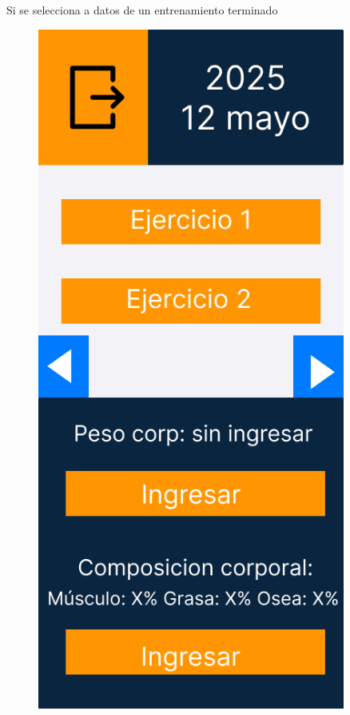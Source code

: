 Si se selecciona a datos de un entrenamiento terminado
\begin{figure}[H]
   \centering
   \begin{minipage}{0.45\textwidth}
      \centering
      \includegraphics[width=0.9\textwidth]{fotos/Frame 33.png}

\end{minipage}
\end{figure}
